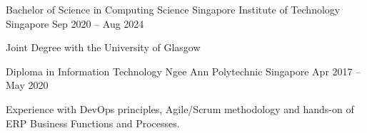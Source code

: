

\begin{cventries}

  \cventry
  {Bachelor of Science in Computing Science} %
  {Singapore Institute of Technology} %
  {Singapore} %
  {Sep 2020 – Aug 2024} %
  {
    \begin{cvitems} %
      \item {Joint Degree with the University of Glasgow}\vspace{5mm}
    \end{cvitems}
  }

  \cventry
  {Diploma in Information Technology} %
  {Ngee Ann Polytechnic} %
  {Singapore} %
  {Apr 2017 – May 2020} %
  {
    \begin{cvitems} %
      \item {Experience with DevOps principles, Agile/Scrum methodology and hands-on of ERP Business Functions and Processes. }\vspace{5mm}
    \end{cvitems}
  }

\end{cventries}